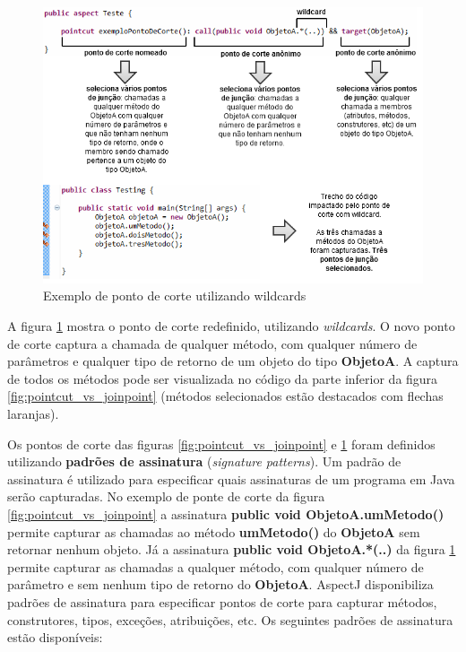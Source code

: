 \begin{figure}
	\centering
	\includegraphics{img/pointcut_vs_joinpoint_wildcard.png}
	\caption{Exemplo de ponto de corte utilizando wildcards}\label{fig:pointcut_vs_joinpoint_wildcard}
\end{figure}

A figura \ref{fig:pointcut_vs_joinpoint_wildcard} mostra o ponto de corte redefinido, utilizando \textit{wildcards}. 
O novo ponto de corte captura a chamada de qualquer método, com qualquer número
de parâmetros e qualquer tipo de retorno de um objeto do tipo \textbf{ObjetoA}.
A captura de todos os métodos pode ser visualizada no código da parte inferior
da figura \ref{fig:pointcut_vs_joinpoint} (métodos selecionados estão destacados
com flechas laranjas).

Os pontos de corte das figuras \ref{fig:pointcut_vs_joinpoint} e \ref{fig:pointcut_vs_joinpoint_wildcard} foram definidos utilizando \textbf{padrões
de assinatura} (\textit{signature patterns}). Um padrão de assinatura é utilizado para especificar quais assinaturas de um programa em Java serão capturadas. No
exemplo de ponte de corte da figura \ref{fig:pointcut_vs_joinpoint} a assinatura \textbf{public void ObjetoA.umMetodo()} permite capturar as chamadas
ao método \textbf{umMetodo()} do \textbf{ObjetoA} sem retornar nenhum objeto. Já a assinatura \textbf{public void ObjetoA.*(..)} da 
figura \ref{fig:pointcut_vs_joinpoint_wildcard} permite capturar as chamadas a qualquer método, com qualquer número de parâmetro e sem nenhum
tipo de retorno do \textbf{ObjetoA}. AspectJ disponibiliza padrões de assinatura para especificar pontos de corte para capturar métodos, construtores,
tipos, exceções, atribuições, etc. Os seguintes padrões de assinatura estão disponíveis:

